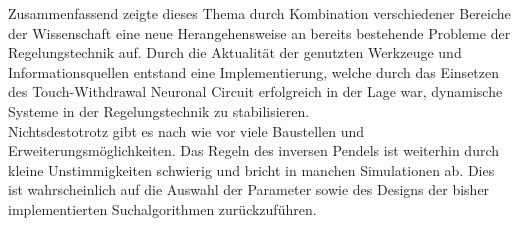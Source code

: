	Zusammenfassend zeigte dieses Thema durch Kombination verschiedener Bereiche der Wissenschaft eine neue Herangehensweise an bereits bestehende Probleme der Regelungstechnik auf. Durch die Aktualität der genutzten Werkzeuge und Informationsquellen entstand eine Implementierung, welche durch das Einsetzen des Touch-Withdrawal Neuronal Circuit \cite{WormLevelRL} erfolgreich in der Lage war, dynamische Systeme in der Regelungstechnik zu stabilisieren.\\
	Nichtsdestotrotz gibt es nach wie vor viele Baustellen und Erweiterungsmöglichkeiten. Das Regeln des inversen Pendels ist weiterhin durch kleine Unstimmigkeiten schwierig und bricht in manchen Simulationen ab. Dies ist wahrscheinlich auf die Auswahl der Parameter sowie des Designs der bisher implementierten Suchalgorithmen zurückzuführen.

